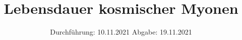 

\subject{V01}
\title{Lebensdauer kosmischer Myonen}
\date{%
  Durchführung: 10.11.2021
  \hspace{3em}
  Abgabe: 19.11.2021
}



\maketitle
\thispagestyle{empty}
\tableofcontents
\newpage



\newpage

\newpage


\newpage


\printbibliography{}


